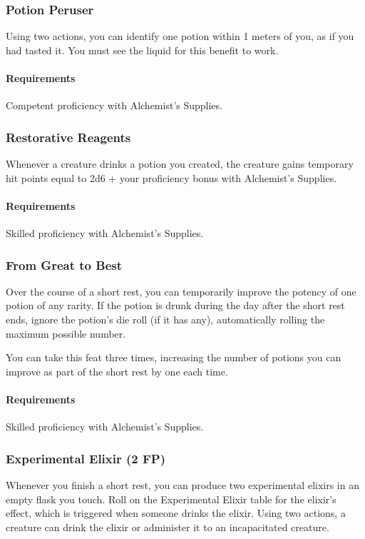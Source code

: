 \subsubsection{Potion Peruser} \label{feat::potionperuser}
    Using two actions, you can identify one potion within 1 meters of you, as if you had tasted it.
    You must see the liquid for this benefit to work.
    \paragraph{Requirements} Competent proficiency with Alchemist's Supplies.
\subsubsection{Restorative Reagents} \label{feat::restorativereagents}
    Whenever a creature drinks a potion you created, the creature gains temporary hit points equal to 2d6 + your proficiency bonus with Alchemist's Supplies.
    \paragraph{Requirements} Skilled proficiency with Alchemist's Supplies.
\subsubsection{From Great to Best} \label{feat::fromgreattobest}
    Over the course of a short rest, you can temporarily improve the potency of one potion of any rarity.
    If the potion is drunk during the day after the short rest ends, ignore the potion's die roll (if it has any), automatically rolling the maximum possible number.

    You can take this feat three times, increasing the number of potions you can improve as part of the short rest by one each time.
    \paragraph{Requirements} Skilled proficiency with Alchemist's Supplies.
\subsubsection{Experimental Elixir (2 FP)} \label{feat::experimentalelixir}
    Whenever you finish a short rest, you can produce two experimental elixirs in an empty flask you touch.
    Roll on the Experimental Elixir table for the elixir's effect, which is triggered when someone drinks the elixir.
    Using two actions, a creature can drink the elixir or administer it to an incapacitated creature.

